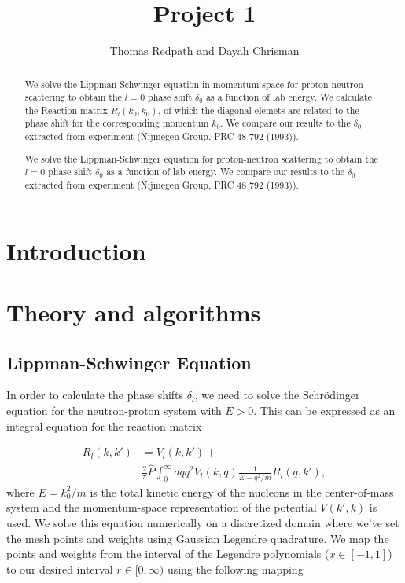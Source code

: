 \documentclass[10pt,showpacs,preprintnumbers,footinbib,amsmath,amssymb,aps,prl,twocolumn,groupedaddress,superscriptaddress,showkeys]{revtex4-1}
\begin{document}
\title{Project 1}
\author{Thomas Redpath and Dayah Chrisman}
\begin{abstract}

We solve the Lippman-Schwinger equation in momentum space for proton-neutron scattering to obtain the $l=0$
phase shift $\delta _0$ as a function of lab energy. We calculate the Reaction matrix $R_l(k_0,k_0)$, of which the
diagonal elemets are related to the phase shift for the corresponding momentum $k_0$. We compare our results to the $\delta _0$
extracted from experiment (Nijmegen Group, PRC 48 792 (1993)).

We solve the Lippman-Schwinger equation for proton-neutron scattering to obtain the $l=0$
phase shift $\delta _0$ as a function of lab energy. We compare our results to the $\delta _0$
extracted from experiment (Nijmegen Group, PRC 48 792 (1993)).

\end{abstract}
\maketitle

\section{Introduction}




\section{Theory and algorithms}\label{sec:theory}

\subsection{Lippman-Schwinger Equation}

In order to calculate the phase shifts $\delta_l$, we need to solve the Schr{\"o}dinger equation
for the neutron-proton system with $E > 0$. This can be expressed as an integral equation for
the reaction matrix

\begin{equation}
\begin{split}
    R_l(k,k') &= V_l(k,k') + \\
  &\frac{2}{\pi}\hat{P}
                \int_0^{\infty}dqq^2V_l(k,q)\frac{1}{E-q^2/m}R_l(q,k'),
   \label{eq:ls1}
\end{split}
\end{equation}
where $E = k _0 ^2 / m$ is the total kinetic energy of the nucleons in the center-of-mass
system and the momentum-space representation of the potential $V(k',k)$ is used. We solve this
equation numerically on a discretized domain where we've set the mesh points and
weights using Gaussian Legendre quadrature. We map the points and weights from the interval of
the Legendre polynomials ($x \in [-1,1]$) to our desired interval $r \in [0,\infty)$ using the
following mapping
\end{document}
